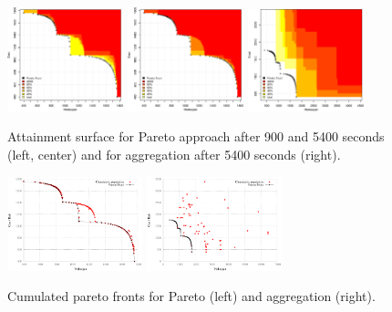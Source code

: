 \documentclass{llncs}
\begin{document}
\begin{figure}[h!]
  \centering
      \includegraphics[width=0.30\textwidth]{medium_att_area_EAFALL_900}
      \includegraphics[width=0.30\textwidth]{medium_att_area_EAFALL}
      \includegraphics[width=0.30\textwidth]{medium_aggreg_att_area}
 \caption{\label{medium_eaf} Attainment surface for Pareto approach after 900 and 5400 seconds (left, center) and for aggregation after 5400 seconds (right).}
\end{figure}

\begin{figure}[h!]
  \centering
      \includegraphics[width=0.35\textwidth]{medium_cumulated}
      \includegraphics[width=0.35\textwidth]{medium_aggreg_cumulated}
 \caption{\label{medium_cum} Cumulated pareto fronts for Pareto (left) and aggregation (right).}
\end{figure}
\end{document}
